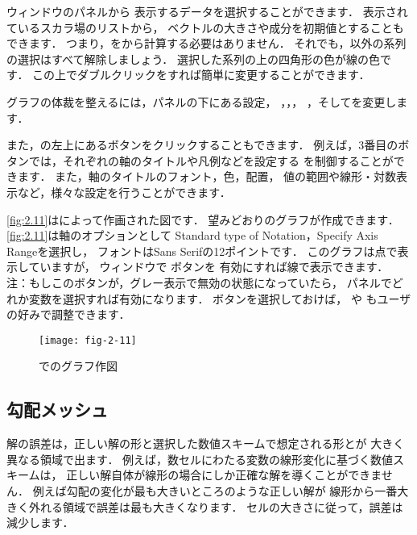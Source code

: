 ウィンドウのパネルから
表示するデータを選択することができます．
表示されているスカラ場のリストから，
ベクトルの大きさや成分を初期値とすることもできます．
つまり，をから計算する必要はありません．
それでも，以外の系列の選択はすべて解除しましょう．
選択した系列の上の四角形の色が線の色です．
この上でダブルクリックをすれば簡単に変更することができます．

グラフの体裁を整えるには，パネルの下にある設定，
，，，
，そしてを変更します．

また，の左上にあるボタンをクリックすることもできます．
例えば，3番目のボタンでは，それぞれの軸のタイトルや凡例などを設定する
を制御することができます．
また，軸のタイトルのフォント，色，配置，
値の範囲や線形・対数表示など，様々な設定を行うことができます．

\autoref{fig:2.11}はによって作画された図です．
望みどおりのグラフが作成できます．
\autoref{fig:2.11}は軸のオプションとして
Standard type of Notation，Specify Axis Rangeを選択し，
フォントはSans Serifの12ポイントです．
このグラフは点で表示していますが，
ウィンドウで
%
%
ボタンを
有効にすれば線で表示できます．
注：もしこのボタンが，グレー表示で無効の状態になっていたら，
パネルでどれか変数を選択すれば有効になります．
ボタンを選択しておけば，
%
%
や
%
%
もユーザの好みで調整できます．


\begin{figure}[ht]
 \texttt{[image: fig-2-11]}
 \caption{でのグラフ作図}
 \label{fig:2.11}
\end{figure}


\subsection{勾配メッシュ}
\label{ssec:2.1.6}
解の誤差は，正しい解の形と選択した数値スキームで想定される形とが
大きく異なる領域で出ます．
例えば，数セルにわたる変数の線形変化に基づく数値スキームは，
正しい解自体が線形の場合にしか正確な解を導くことができません．
例えば勾配の変化が最も大きいところのような正しい解が
線形から一番大きく外れる領域で誤差は最も大きくなります．
セルの大きさに従って，誤差は減少します．

